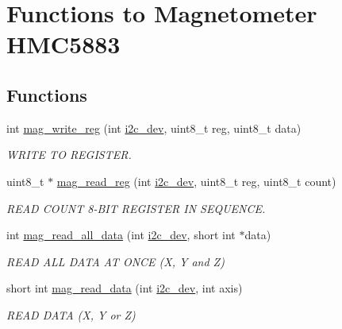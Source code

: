\hypertarget{group__mag}{\section{Functions to Magnetometer H\-M\-C5883}
\label{group__mag}
}
\subsection*{Functions}
\begin{DoxyCompactItemize}
\item 
int \hyperlink{group__mag_gab5d0ae421cd4bb10b1b7a1eda167416b}{mag\-\_\-write\-\_\-reg} (int \hyperlink{CommunicationV0_2communication_8c_a7751bd45ac1064efb35adf1f19c25db8}{i2c\-\_\-dev}, uint8\-\_\-t reg, uint8\-\_\-t data)
\begin{DoxyCompactList}\small\item\em W\-R\-I\-T\-E T\-O R\-E\-G\-I\-S\-T\-E\-R. \end{DoxyCompactList}\item 
uint8\-\_\-t $\ast$ \hyperlink{group__mag_ga6830eaeae2298320e1e8c902e4edd709}{mag\-\_\-read\-\_\-reg} (int \hyperlink{CommunicationV0_2communication_8c_a7751bd45ac1064efb35adf1f19c25db8}{i2c\-\_\-dev}, uint8\-\_\-t reg, uint8\-\_\-t count)
\begin{DoxyCompactList}\small\item\em R\-E\-A\-D C\-O\-U\-N\-T 8-\/\-B\-I\-T R\-E\-G\-I\-S\-T\-E\-R I\-N S\-E\-Q\-U\-E\-N\-C\-E. \end{DoxyCompactList}\item 
int \hyperlink{group__mag_gab42ae0d0a2a6f37cf36d856c072b7f34}{mag\-\_\-read\-\_\-all\-\_\-data} (int \hyperlink{CommunicationV0_2communication_8c_a7751bd45ac1064efb35adf1f19c25db8}{i2c\-\_\-dev}, short int $\ast$data)
\begin{DoxyCompactList}\small\item\em R\-E\-A\-D A\-L\-L D\-A\-T\-A A\-T O\-N\-C\-E (X, Y and Z) \end{DoxyCompactList}\item 
short int \hyperlink{group__mag_ga542a31ccd07cd2c3e8e2b68cdb6d219e}{mag\-\_\-read\-\_\-data} (int \hyperlink{CommunicationV0_2communication_8c_a7751bd45ac1064efb35adf1f19c25db8}{i2c\-\_\-dev}, int axis)
\begin{DoxyCompactList}\small\item\em R\-E\-A\-D D\-A\-T\-A (X, Y or Z) \end{DoxyCompactList}\end{DoxyCompactItemize}


